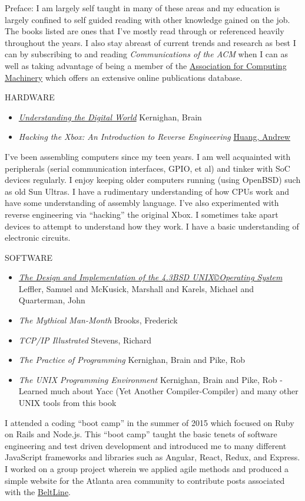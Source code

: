 \documentclass[12pt]{report}
\begin{document}
Preface: I am largely self taught in many of these areas and my education is largely confined to self guided reading with other knowledge gained on the job. The books listed are ones that I've mostly read through or referenced heavily throughout the years. I also stay abreast of current trends and research as best I can by subscribing to and reading \emph {Communications of the ACM} when I can as well as taking advantage of being a member of the \href{https://www.acm.org/}{Association for Computing Machinery} which offers an extensive online publications database.\hfill \break

HARDWARE
\begin{itemize}
        \item \href{https://press.princeton.edu/books/ebook/9780691218960/understanding-the-digital-world}{\emph {Understanding the Digital World}} Kernighan, Brain
        \item \emph {Hacking the Xbox: An Introduction to Reverse Engineering} \href{https://en.wikipedia.org/wiki/Andrew_Huang_(hacker)}{Huang, Andrew}
\end{itemize}
I've been assembling computers since my teen years. I am well acquainted with peripherals (serial communication interfaces, GPIO, et al) and tinker with SoC devices regularly. I enjoy keeping older computers running (using OpenBSD) such as old Sun Ultras. I have a rudimentary understanding of how CPUs work and have some understanding of assembly language. I've also experimented with reverse engineering via ``hacking'' the original Xbox. I sometimes take apart devices to attempt to understand how they work. I have a basic understanding of electronic circuits.\hfill \break

SOFTWARE
\begin{itemize}
        \item \href{https://archive.org/details/designimplementa0000unse}{\emph {The Design and Implementation of the 4.3BSD UNIX\copyright Operating System}} Leffler, Samuel and McKusick, Marshall and Karels, Michael and Quarterman, John
  \item \emph {The Mythical Man-Month} Brooks, Frederick
  \item \emph {TCP/IP Illustrated} Stevens, Richard
  \item \emph {The Practice of Programming} Kernighan, Brain and Pike, Rob
  \item \emph {The UNIX Programming Environment} Kernighan, Brain and Pike, Rob - Learned much about Yacc (Yet Another Compiler-Compiler) and many other UNIX tools from this book
\end{itemize}
I attended a coding ``boot camp'' in the summer of 2015 which focused on Ruby on Rails and Node.js. This ``boot camp'' taught the basic tenets of software engineering and test driven development and introduced me to many different JavaScript frameworks and libraries such as Angular, React, Redux, and Express. I worked on a group project wherein we applied agile methods and produced a simple website for the Atlanta area community to contribute posts associated with the \href{https://en.wikipedia.org/wiki/BeltLine}{BeltLine}.
\end{document}
